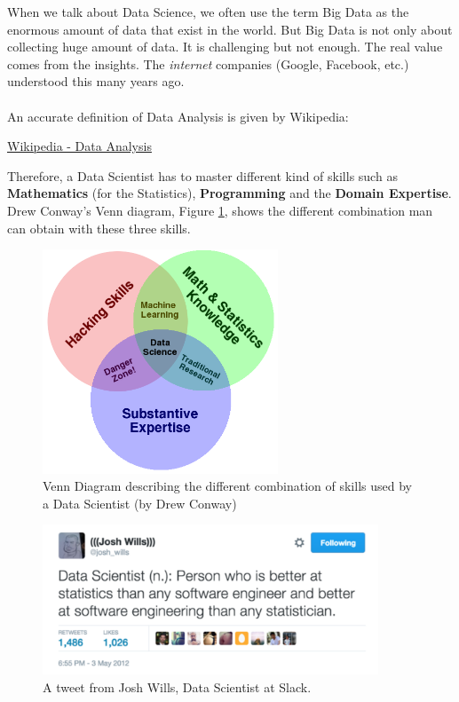 \documentclass[a4paper,11pt,twoside]{article}
\begin{document}
When we talk about Data Science, we often use the term Big Data as the enormous amount of data that exist in the world. But Big Data is not only about collecting huge amount of data. It is challenging but not enough. The real value comes from the insights. The {\it internet} companies (Google, Facebook, etc.) 
understood this many years ago.
\\ \\
An accurate definition of Data Analysis is given by Wikipedia:

\begin{flushright}
 \vspace{-0.8cm}
 \href{https://en.wikipedia.org/wiki/Data\_analysis}{Wikipedia - Data Analysis}
\end{flushright}

Therefore, a Data Scientist has to master different kind of skills such as {\bf Mathematics} (for the Statistics), {\bf Programming} and the {\bf Domain Expertise}. Drew Conway's Venn diagram, Figure \ref{img:venn}, shows the different combination man can obtain with these three skills.

\begin{figure}[H]
 \centering
 \includegraphics[width=7cm]{./pic/Data_Science_VD.png}
 \caption{\label{img:venn} Venn Diagram describing the different combination of skills used by a Data Scientist (by Drew Conway)}
\end{figure}

\begin{figure}[H]
 \centering
 \includegraphics[width=10cm]{./pic/tweet_wills.png}
 \caption{\label{img:tweet_wills} A tweet from Josh Wills, Data Scientist at Slack.}
\end{figure}
\end{document}

